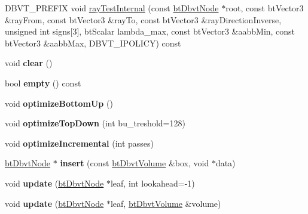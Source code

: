 \begin{DoxyCompactItemize}
\item 
D\+B\+V\+T\+\_\+\+P\+R\+E\+F\+IX void \hyperlink{structbtDbvt_a0704881c8799d5326308a6bf210fdfd3}{ray\+Test\+Internal} (const \hyperlink{structbtDbvtNode}{bt\+Dbvt\+Node} $\ast$root, const bt\+Vector3 \&ray\+From, const bt\+Vector3 \&ray\+To, const bt\+Vector3 \&ray\+Direction\+Inverse, unsigned int signs\mbox{[}3\mbox{]}, bt\+Scalar lambda\+\_\+max, const bt\+Vector3 \&aabb\+Min, const bt\+Vector3 \&aabb\+Max, D\+B\+V\+T\+\_\+\+I\+P\+O\+L\+I\+CY) const
\item 
\mbox{\label{structbtDbvt_a91d88cec6f5e212809cb9f47a967090c}} 
void {\bfseries clear} ()
\item 
\mbox{\label{structbtDbvt_a88e6b1c04dfb42e96c68662c74790b24}} 
bool {\bfseries empty} () const
\item 
\mbox{\label{structbtDbvt_a03c5cfc17ee3f6a89d86bf1028db34b0}} 
void {\bfseries optimize\+Bottom\+Up} ()
\item 
\mbox{\label{structbtDbvt_a20c410b4825eab53cdcd2e2870e289aa}} 
void {\bfseries optimize\+Top\+Down} (int bu\+\_\+treshold=128)
\item 
\mbox{\label{structbtDbvt_a198643b190f8cdac7d7d62cef8cf9bb1}} 
void {\bfseries optimize\+Incremental} (int passes)
\item 
\mbox{\label{structbtDbvt_abe71d676e51d7e78b62c9989e2349bba}} 
\hyperlink{structbtDbvtNode}{bt\+Dbvt\+Node} $\ast$ {\bfseries insert} (const \hyperlink{structbtDbvtAabbMm}{bt\+Dbvt\+Volume} \&box, void $\ast$data)
\item 
\mbox{\label{structbtDbvt_a6efe1f6bb9abd80ea76d1bfa97cebd2b}} 
void {\bfseries update} (\hyperlink{structbtDbvtNode}{bt\+Dbvt\+Node} $\ast$leaf, int lookahead=-\/1)
\item 
\mbox{\label{structbtDbvt_a9a3ffbdaf6e85eb9ea7ac14094bcf139}} 
void {\bfseries update} (\hyperlink{structbtDbvtNode}{bt\+Dbvt\+Node} $\ast$leaf, \hyperlink{structbtDbvtAabbMm}{bt\+Dbvt\+Volume} \&volume)
\item 
\mbox{\label{structbtDbvt_a49dd2a5129f72f2fef26c52d4c326c8d}} 

\end{DoxyCompactItemize}

